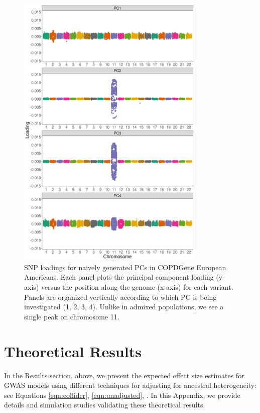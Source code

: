 \documentclass[12pt]{article}
\newcommand{\edit}[1]{{\color{red}{#1}}}
\begin{document}
\begin{figure}[!htb]
\center
\includegraphics[width=0.8\textwidth]{figs/COPD/EUR_prune_FALSE_1_0_0.01_snprelate_load_1}
\caption{SNP loadings for naively generated PCs in COPDGene European Americans. Each panel plots the principal component loading (y-axis) versus the position along the genome (x-axis) for each variant. Panels are organized vertically according to which PC is being investigated (1, 2, 3, 4). Unlike in admixed populations, we see a single peak on chromosome 11.}
\label{fig:corr-Eur}
\end{figure}


\newpage
\section{Theoretical Results}

In the Results section, above, we present the expected effect size estimates for GWAS models using different techniques for adjusting for ancestral heterogeneity: see Equations \ref{eqn:collider}, \ref{eqn:unadjusted}, \edit{add reference number for third equation}.
In this Appendix, we provide details and simulation studies validating these theoretical results.
\end{document}
